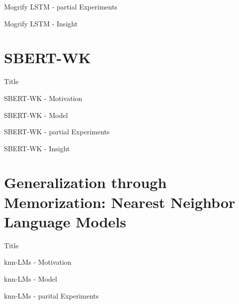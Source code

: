 \documentclass[10pt]{beamer}
\begin{document}
\begin{frame}{Mogrify LSTM - partial Experiments}

\end{frame}

\begin{frame}{Mogrify LSTM - Insight}

\end{frame}

\section{SBERT-WK}

\begin{frame}{Title}
    
\end{frame}

\begin{frame}{SBERT-WK - Motivation}

\end{frame}

\begin{frame}{SBERT-WK - Model}

\end{frame}

\begin{frame}{SBERT-WK - partial Experiments}

\end{frame}

\begin{frame}{SBERT-WK - Insight}

\end{frame}

\section{Generalization through Memorization: Nearest Neighbor Language Models}

\begin{frame}{Title}
    
\end{frame}

\begin{frame}{knn-LMs - Motivation}

\end{frame}

\begin{frame}{knn-LMs - Model}

\end{frame}

\begin{frame}{knn-LMs - parital Experiments}

\end{frame}
\end{document}
